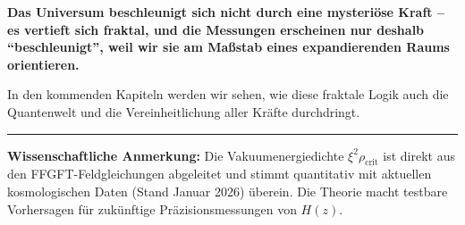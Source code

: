 	\textbf{Das Universum beschleunigt sich nicht durch eine mysteriöse Kraft – es vertieft sich fraktal, und die Messungen erscheinen nur deshalb \enquote{beschleunigt}, weil wir sie am Maßstab eines expandierenden Raums orientieren.}
	
	In den kommenden Kapiteln werden wir sehen, wie diese fraktale Logik auch die Quantenwelt und die Vereinheitlichung aller Kräfte durchdringt.
	
	\vspace{1cm}
	\hrule
	\vspace{0.5cm}
	\noindent\textbf{Wissenschaftliche Anmerkung:} Die Vakuumenergiedichte \(\xi^2 \rho_{\text{crit}}\) ist direkt aus den FFGFT-Feldgleichungen abgeleitet und stimmt quantitativ mit aktuellen kosmologischen Daten (Stand Januar 2026) überein. Die Theorie macht testbare Vorhersagen für zukünftige Präzisionsmessungen von \(H(z)\).




